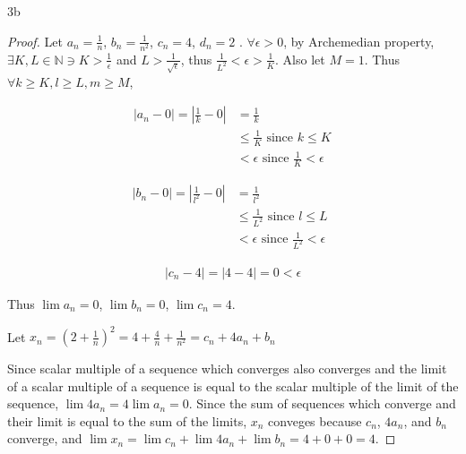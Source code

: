 \documentclass{article}
\newcommand{\N}{\mathbb{N}}
\newcommand{\abs}[1]{\left\vert #1\right \vert}
\begin{document}
\begin{PROB}{3b}\label{Problem 3b.}
\end{PROB}
\begin{proof}
    Let $a_n = \frac{1}{n}$, $b_n = \frac{1}{n^2}$, $c_n = 4$, $d_n = 2$ .
    $\forall \epsilon > 0$, by Archemedian property, $\exists K, L \in \N \ni K > \frac{1}{\epsilon}$ and $L > \frac{1}{\sqrt{\epsilon}}$, thus $\frac{1}{L^2} < \epsilon > \frac{1}{K}$. Also let $M = 1$.    Thus $\forall k \geq K, l \geq L, m \geq M$, 
    
    \begin{align*}
        \abs{a_n - 0} = \abs{\frac{1}{k} - 0} &= \frac{1}{k} \\
        &\leq \frac{1}{K} \text{ since $k \leq K$} \\
        &< \epsilon \text{ since $\frac{1}{K} < \epsilon$ } 
    \end{align*}

    \begin{align*}
        \abs{b_n - 0} = \abs{\frac{1}{l^2} - 0} &= \frac{1}{l^2} \\
        &\leq \frac{1}{L^2} \text{ since $l \leq L$} \\
        &< \epsilon \text{ since $\frac{1}{L^2} < \epsilon$ } 
    \end{align*}

    \begin{align*}
        \abs{c_n  - 4} = \abs{4 - 4} = 0 < \epsilon 
    \end{align*}

    Thus $\lim a_n = 0$, $\lim b_n = 0$, $\lim c_n = 4$.
    
    Let $x_n = (2 + \frac{1}{n})^2 = 4 + \frac{4}{n} + \frac{1}{n^2} = c_n + 4a_n + b_n$
    
    Since scalar multiple of a sequence which converges also converges and the limit of a scalar multiple of a sequence is equal to the scalar multiple of the limit of the sequence, $\lim 4a_n = 4 \lim a_n = 0$. Since the sum of sequences which converge and their limit is equal to the sum of the limits, $x_n$ conveges because $c_n$, $4a_n$, and $b_n$ converge, and $\lim x_n = \lim c_n + \lim 4a_n + \lim b_n  = 4 + 0 + 0 = 4$.       
\end{proof}
\end{document}
